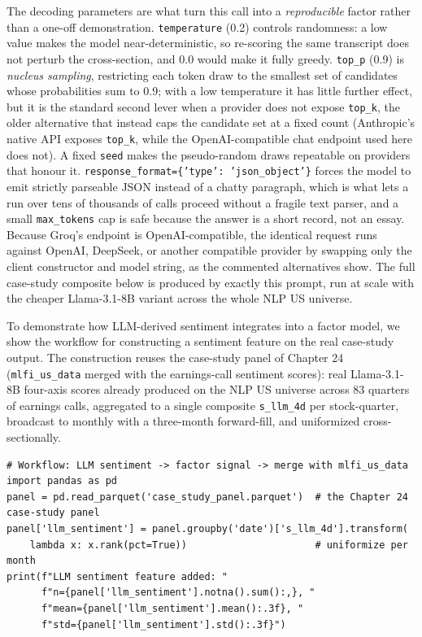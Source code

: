 The decoding parameters are what turn this call into a \textit{reproducible} factor rather than a one-off demonstration. \texttt{temperature} (0.2) controls randomness: a low value makes the model near-deterministic, so re-scoring the same transcript does not perturb the cross-section, and 0.0 would make it fully greedy. \texttt{top\_p} (0.9) is \textit{nucleus sampling}, restricting each token draw to the smallest set of candidates whose probabilities sum to 0.9; with a low temperature it has little further effect, but it is the standard second lever when a provider does not expose \texttt{top\_k}, the older alternative that instead caps the candidate set at a fixed count (Anthropic's native API exposes \texttt{top\_k}, while the OpenAI-compatible chat endpoint used here does not). A fixed \texttt{seed} makes the pseudo-random draws repeatable on providers that honour it. \texttt{response\_format=\{'type': 'json\_object'\}} forces the model to emit strictly parseable JSON instead of a chatty paragraph, which is what lets a run over tens of thousands of calls proceed without a fragile text parser, and a small \texttt{max\_tokens} cap is safe because the answer is a short record, not an essay. Because Groq's endpoint is OpenAI-compatible, the identical request runs against OpenAI, DeepSeek, or another compatible provider by swapping only the client constructor and model string, as the commented alternatives show. The full case-study composite below is produced by exactly this prompt, run at scale with the cheaper Llama-3.1-8B variant across the whole NLP US universe.

To demonstrate how LLM-derived sentiment integrates into a factor model, we show the workflow for constructing a sentiment feature on the real case-study output. The construction reuses the case-study panel of Chapter 24 (\texttt{mlfi\_us\_data} merged with the earnings-call sentiment scores): real Llama-3.1-8B four-axis scores already produced on the NLP US universe across 83 quarters of earnings calls, aggregated to a single composite \texttt{s\_llm\_4d} per stock-quarter, broadcast to monthly with a three-month forward-fill, and uniformized cross-sectionally.

\begin{verbatim}
# Workflow: LLM sentiment -> factor signal -> merge with mlfi_us_data
import pandas as pd
panel = pd.read_parquet('case_study_panel.parquet')  # the Chapter 24 case-study panel
panel['llm_sentiment'] = panel.groupby('date')['s_llm_4d'].transform(
    lambda x: x.rank(pct=True))                      # uniformize per month
print(f"LLM sentiment feature added: "
      f"n={panel['llm_sentiment'].notna().sum():,}, "
      f"mean={panel['llm_sentiment'].mean():.3f}, "
      f"std={panel['llm_sentiment'].std():.3f}")
\end{verbatim}


